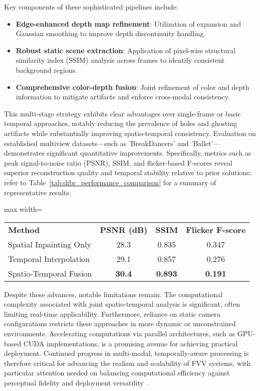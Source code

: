 Key components of these sophisticated pipelines include:
\begin{itemize}
    \item \textbf{Edge-enhanced depth map refinement}: Utilization of expansion and Gaussian smoothing to improve depth discontinuity handling.
    \item \textbf{Robust static scene extraction}: Application of pixel-wise structural similarity index (SSIM) analysis across frames to identify consistent background regions.
    \item \textbf{Comprehensive color-depth fusion}: Joint refinement of color and depth information to mitigate artifacts and enforce cross-modal consistency.
\end{itemize}

This multi-stage strategy exhibits clear advantages over single-frame or basic temporal approaches, notably reducing the prevalence of holes and ghosting artifacts while substantially improving spatio-temporal consistency. Evaluation on established multiview datasets—such as 'BreakDancers' and 'Ballet'—demonstrates significant quantitative improvements. Specifically, metrics such as peak signal-to-noise ratio (PSNR), SSIM, and flicker-based F-scores reveal superior reconstruction quality and temporal stability relative to prior solutions; refer to Table~\ref{tab:dibr_performance_comparison} for a summary of representative results.

\begin{table*}[htbp]
\centering
\caption{Performance comparison of DIBR approaches on multiview datasets.}
\label{tab:dibr_performance_comparison}
\begin{adjustbox}{max width=\textwidth}
\begin{tabular}{lccc}
\toprule
\textbf{Method} & \textbf{PSNR (dB)} & \textbf{SSIM} & \textbf{Flicker F-score} \\
Spatial Inpainting Only   & 28.3 & 0.835 & 0.347 \\
Temporal Interpolation    & 29.1 & 0.857 & 0.276 \\
Spatio-Temporal Fusion    & \textbf{30.4} & \textbf{0.893} & \textbf{0.191} \\
\bottomrule
\end{tabular}
\end{adjustbox}
\end{table*}

Despite these advances, notable limitations remain. The computational complexity associated with joint spatio-temporal analysis is significant, often limiting real-time applicability. Furthermore, reliance on static camera configurations restricts these approaches in more dynamic or unconstrained environments. Accelerating computations via parallel architectures, such as GPU-based CUDA implementations, is a promising avenue for achieving practical deployment. Continued progress in multi-modal, temporally-aware processing is therefore critical for advancing the realism and scalability of FVV systems, with particular attention needed on balancing computational efficiency against perceptual fidelity and deployment versatility~\cite{refFVVRef98}.

